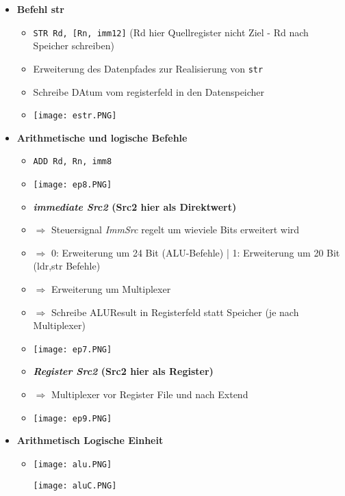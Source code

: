 \begin{itemize}
        \item \textbf{Befehl str}
            \begin{itemize}
                \item \texttt{STR Rd, [Rn, imm12]} (Rd hier Quellregister nicht Ziel - Rd nach Speicher schreiben)
                \item Erweiterung des Datenpfades zur Realisierung von \texttt{str}
                \item Schreibe DAtum vom registerfeld in den Datenspeicher
                \item[] \texttt{[image: estr.PNG]}
            \end{itemize}

        \item \textbf{Arithmetische und logische Befehle}
            \begin{itemize}
                \item \texttt{ADD Rd, Rn, imm8}
                \item[] \texttt{[image: ep8.PNG]}
                \item \textbf{\textit{immediate Src2} (Src2 hier als Direktwert)}
                \item[] $\Rightarrow$ Steuersignal \textit{ImmSrc} regelt um wieviele Bits erweitert wird
                \item[] $\Rightarrow$ 0: Erweiterung um 24 Bit (ALU-Befehle) | 1: Erweiterung um 20 Bit (ldr,str Befehle)
                \item[] $\Rightarrow$ Erweiterung um Multiplexer 
                \item[] $\Rightarrow$ Schreibe ALUResult in Registerfeld statt Speicher (je nach Multiplexer)
                \item[] \texttt{[image: ep7.PNG]}
                \item \textbf{\textit{Register Src2} (Src2 hier als Register)}
                \item[] $\Rightarrow$ Multiplexer vor Register File und nach Extend
                \item[] \texttt{[image: ep9.PNG]}
            \end{itemize}

        \item \textbf{Arithmetisch Logische Einheit}
            \begin{itemize}
                \item[] 
                    \begin{minipage}{0.5\textwidth}
                        \texttt{[image: alu.PNG]}
                    \end{minipage}
                    \begin{minipage}{0.4\textwidth}
                        \texttt{[image: aluC.PNG]}
                    \end{minipage}
            \end{itemize}


\end{itemize}
